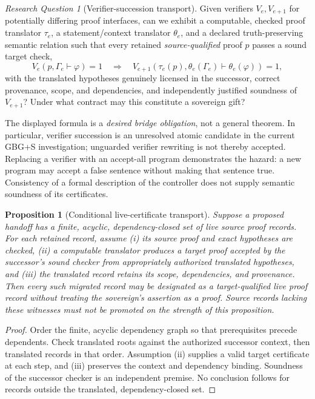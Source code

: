 \documentclass[11pt,letterpaper]{article}
\newtheorem{proposition}[definition]{Proposition}
\theoremstyle{remark}
\newtheorem{question}[definition]{Research Question}
\begin{document}
\begin{question}[Verifier-succession transport]\label{q:verifier}
Given verifiers $V_e,V_{e+1}$ for potentially differing proof interfaces, can we exhibit a computable, checked proof translator $\tau_e$, a statement/context translator $\theta_e$, and a declared truth-preserving semantic relation such that every retained \emph{source-qualified} proof $p$ passes a sound target check,
\[
V_e(p,\Gamma_e\vdash\varphi)=1\quad\Longrightarrow\quad
V_{e+1}(\tau_e(p),\theta_e(\Gamma_e)\vdash\theta_e(\varphi))=1,
\]
with the translated hypotheses genuinely licensed in the successor, correct provenance, scope, and dependencies, and independently justified soundness of $V_{e+1}$? Under what contract may this constitute a sovereign gift?
\end{question}

The displayed formula is a \emph{desired bridge obligation}, not a general theorem. In particular, verifier succession is an unresolved atomic candidate in the current GBG+S investigation; unguarded verifier rewriting is not thereby accepted. Replacing a verifier with an accept-all program demonstrates the hazard: a new program may accept a false sentence without making that sentence true. Consistency of a formal description of the controller does not supply semantic soundness of its certificates.

\begin{proposition}[Conditional live-certificate transport]\label{prop:transport}
Suppose a proposed handoff has a finite, acyclic, dependency-closed set of live source proof records. For each retained record, assume (i) its source proof and exact hypotheses are checked, (ii) a computable translator produces a target proof accepted by the successor's sound checker from appropriately authorized translated hypotheses, and (iii) the translated record retains its scope, dependencies, and provenance. Then every such migrated record may be designated as a \emph{target-qualified} live proof record without treating the sovereign's assertion as a proof. Source records lacking these witnesses must not be promoted on the strength of this proposition.
\end{proposition}
\begin{proof}
Order the finite, acyclic dependency graph so that prerequisites precede dependents. Check translated roots against the authorized successor context, then translated records in that order. Assumption (ii) supplies a valid target certificate at each step, and (iii) preserves the context and dependency binding. Soundness of the successor checker is an independent premise. No conclusion follows for records outside the translated, dependency-closed set.
\end{proof}
\end{document}

